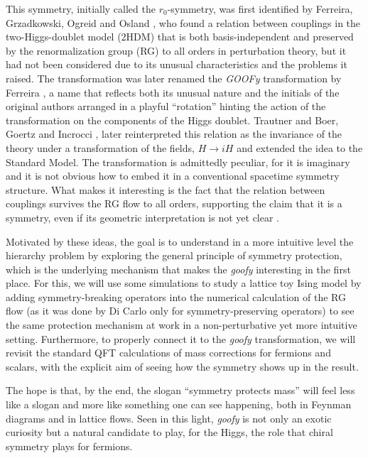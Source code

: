 \documentclass[a4paper, 11pt]{article}
\begin{document}
This symmetry, initially called the $r_0$-symmetry, was first identified by Ferreira, Grzadkowski, Ogreid and Osland \cite{2HDM}, who found a relation between couplings in the two-Higgs-doublet model (2HDM) that is both basis-independent and preserved by the renormalization group (RG) to all orders in perturbation theory, but it had not been considered due to its unusual characteristics and the problems it raised. The transformation was later renamed the \emph{GOOFy} transformation by Ferreira \cite{FerreiraHPNP2023}, a name that reflects both its unusual nature and the initials of the original authors arranged in a playful ``rotation'' hinting the action of the transformation on the components of the Higgs doublet. Trautner \cite{Trautner_goofy1} and Boer, Goertz and Incrocci \cite{goofy2}, later reinterpreted this relation as the invariance of the theory under a transformation of the fields, $H \to iH$ and extended the idea to the Standard Model. The transformation is admittedly peculiar, for it is imaginary and it is not obvious how to embed it in a conventional spacetime symmetry structure. What makes it interesting is the fact that the relation between couplings survives the RG flow to all orders, supporting the claim that it is a symmetry, even if its geometric interpretation is not yet clear \cite{2HDM, Trautner_goofy1, goofy2, deBoer_Trautner_Outs}. 


Motivated by these ideas, the goal is to understand in a more intuitive level the hierarchy problem by exploring the general principle of symmetry protection, which is the underlying mechanism that makes the \textit{goofy} interesting in the first place. For this, we will use some simulations to study a lattice toy Ising model by adding symmetry-breaking operators into the numerical calculation of the RG flow (as it was done by Di Carlo \cite{blocking} only for symmetry-preserving operators) to see the same protection mechanism at work in a non-perturbative yet more intuitive setting. Furthermore, to properly connect it to the \textit{goofy} transformation, we will revisit the standard QFT calculations of mass corrections for fermions and scalars, with the explicit aim of seeing how the symmetry shows up in the result. 

The hope is that, by the end, the slogan ``symmetry protects mass'' will feel less like a slogan and more like something one can see happening, both in Feynman diagrams and in lattice flows. Seen in this light, \textit{goofy} is not only an exotic curiosity but a natural candidate to play, for the Higgs, the role that chiral symmetry plays for fermions.
\end{document}
